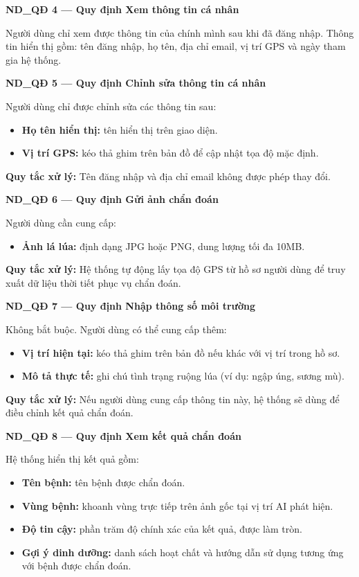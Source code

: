 \documentclass[12pt,a4paper]{article}
\begin{document}
\vspace{0.3cm}
\noindent\textbf{ND\_QĐ 4 --- Quy định Xem thông tin cá nhân}

Người dùng chỉ xem được thông tin của chính mình sau khi đã đăng nhập. Thông tin hiển thị gồm: tên đăng nhập, họ tên, địa chỉ email, vị trí GPS và ngày tham gia hệ thống.

\vspace{0.3cm}
\noindent\textbf{ND\_QĐ 5 --- Quy định Chỉnh sửa thông tin cá nhân}

Người dùng chỉ được chỉnh sửa các thông tin sau:
\begin{itemize}
    \item \textbf{Họ tên hiển thị:} tên hiển thị trên giao diện.
    \item \textbf{Vị trí GPS:} kéo thả ghim trên bản đồ để cập nhật tọa độ mặc định.
\end{itemize}
\textbf{Quy tắc xử lý:} Tên đăng nhập và địa chỉ email không được phép thay đổi.

\vspace{0.3cm}
\noindent\textbf{ND\_QĐ 6 --- Quy định Gửi ảnh chẩn đoán}

Người dùng cần cung cấp:
\begin{itemize}
    \item \textbf{Ảnh lá lúa:} định dạng JPG hoặc PNG, dung lượng tối đa 10MB.
\end{itemize}
\textbf{Quy tắc xử lý:} Hệ thống tự động lấy tọa độ GPS từ hồ sơ người dùng để truy xuất dữ liệu thời tiết phục vụ chẩn đoán.

\vspace{0.3cm}
\noindent\textbf{ND\_QĐ 7 --- Quy định Nhập thông số môi trường}

Không bắt buộc. Người dùng có thể cung cấp thêm:
\begin{itemize}
    \item \textbf{Vị trí hiện tại:} kéo thả ghim trên bản đồ nếu khác với vị trí trong hồ sơ.
    \item \textbf{Mô tả thực tế:} ghi chú tình trạng ruộng lúa (ví dụ: ngập úng, sương mù).
\end{itemize}
\textbf{Quy tắc xử lý:} Nếu người dùng cung cấp thông tin này, hệ thống sẽ dùng để điều chỉnh kết quả chẩn đoán.

\vspace{0.3cm}
\noindent\textbf{ND\_QĐ 8 --- Quy định Xem kết quả chẩn đoán}

Hệ thống hiển thị kết quả gồm:
\begin{itemize}
    \item \textbf{Tên bệnh:} tên bệnh được chẩn đoán.
    \item \textbf{Vùng bệnh:} khoanh vùng trực tiếp trên ảnh gốc tại vị trí AI phát hiện.
    \item \textbf{Độ tin cậy:} phần trăm độ chính xác của kết quả, được làm tròn.
    \item \textbf{Gợi ý dinh dưỡng:} danh sách hoạt chất và hướng dẫn sử dụng tương ứng với bệnh được chẩn đoán.
\end{itemize}
\end{document}
